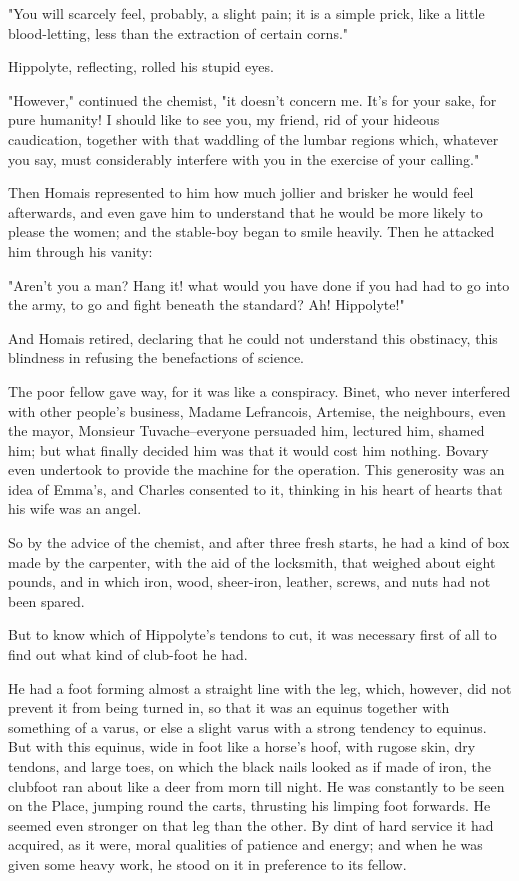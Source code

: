 \documentclass{tufte-book}
\begin{document}
"You will scarcely feel, probably, a slight pain; it is a simple prick,
like a little blood-letting, less than the extraction of certain corns."

Hippolyte, reflecting, rolled his stupid eyes.

"However," continued the chemist, "it doesn't concern me. It's for your
sake, for pure humanity! I should like to see you, my friend, rid of
your hideous caudication, together with that waddling of the lumbar
regions which, whatever you say, must considerably interfere with you in
the exercise of your calling."

Then Homais represented to him how much jollier and brisker he would
feel afterwards, and even gave him to understand that he would be more
likely to please the women; and the stable-boy began to smile heavily.
Then he attacked him through his vanity:

"Aren't you a man? Hang it! what would you have done if you had had to
go into the army, to go and fight beneath the standard? Ah! Hippolyte!"

And Homais retired, declaring that he could not understand this
obstinacy, this blindness in refusing the benefactions of science.

The poor fellow gave way, for it was like a conspiracy. Binet, who never
interfered with other people's business, Madame Lefrancois, Artemise,
the neighbours, even the mayor, Monsieur Tuvache--everyone persuaded
him, lectured him, shamed him; but what finally decided him was that it
would cost him nothing. Bovary even undertook to provide the machine
for the operation. This generosity was an idea of Emma's, and Charles
consented to it, thinking in his heart of hearts that his wife was an
angel.

So by the advice of the chemist, and after three fresh starts, he had a
kind of box made by the carpenter, with the aid of the locksmith,
that weighed about eight pounds, and in which iron, wood, sheer-iron,
leather, screws, and nuts had not been spared.

But to know which of Hippolyte's tendons to cut, it was necessary first
of all to find out what kind of club-foot he had.

He had a foot forming almost a straight line with the leg, which,
however, did not prevent it from being turned in, so that it was an
equinus together with something of a varus, or else a slight varus with
a strong tendency to equinus. But with this equinus, wide in foot like
a horse's hoof, with rugose skin, dry tendons, and large toes, on which
the black nails looked as if made of iron, the clubfoot ran about like
a deer from morn till night. He was constantly to be seen on the Place,
jumping round the carts, thrusting his limping foot forwards. He seemed
even stronger on that leg than the other. By dint of hard service it had
acquired, as it were, moral qualities of patience and energy; and
when he was given some heavy work, he stood on it in preference to its
fellow.
\end{document}
